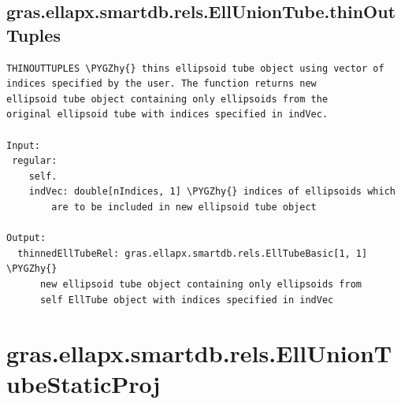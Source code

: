 \documentclass[letterpaper,10pt,english]{sphinxmanual}
\def\PYGZhy{\char`\-}
\begin{document}
\subsection{gras.ellapx.smartdb.rels.EllUnionTube.thinOutTuples}
\label{chap_functions:gras-ellapx-smartdb-rels-elluniontube-thinouttuples}
\begin{Verbatim}[commandchars=\\\{\}]
THINOUTTUPLES \PYGZhy{} thins ellipsoid tube object using vector of
indices specified by the user. The function returns new
ellipsoid tube object containing only ellipsoids from the
original ellipsoid tube with indices specified in indVec.

Input:
 regular:
    self.
    indVec: double[nIndices, 1] \PYGZhy{} indices of ellipsoids which
        are to be included in new ellipsoid tube object

Output:
  thinnedEllTubeRel: gras.ellapx.smartdb.rels.EllTubeBasic[1, 1] \PYGZhy{}
      new ellipsoid tube object containing only ellipsoids from
      self EllTube object with indices specified in indVec
\end{Verbatim}


\section{gras.ellapx.smartdb.rels.EllUnionTubeStaticProj}
\label{chap_functions:gras-ellapx-smartdb-rels-elluniontubestaticproj}
\end{document}
